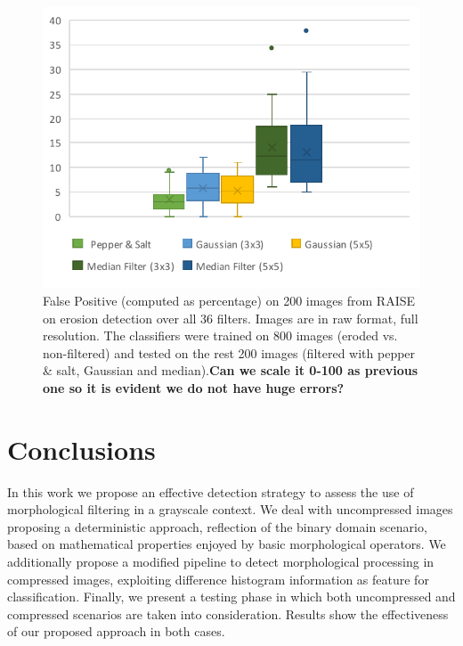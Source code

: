 \documentclass{ieeeaccess}
\begin{document}
\begin{figure}[h!]
	\centering
	\includegraphics[width=\linewidth]{different_filters.pdf}
	\caption{False Positive (computed as percentage) on 200 images from RAISE on erosion detection over all 36 filters. Images are in raw format, full resolution. The classifiers were trained on 800 images (eroded vs. non-filtered) and tested on the rest 200 images (filtered with pepper \& salt, Gaussian and median).\textbf{Can we scale it 0-100 as previous one so it is evident we do not have huge errors?}}
	\label{fig:different_filters}
\end{figure}


\section{Conclusions}
\label{sec:conclusions}
In this work we propose an effective detection strategy to assess the use of morphological filtering in a grayscale context. We deal with uncompressed images proposing a deterministic approach, reflection of the binary domain scenario, based on mathematical properties enjoyed by basic morphological operators. We additionally propose a modified pipeline to detect morphological processing in compressed images, exploiting difference histogram information as feature for  classification. Finally, we present a testing phase in which both uncompressed and compressed scenarios are taken into consideration. Results show the effectiveness of our proposed approach in both cases.  



\end{document}
